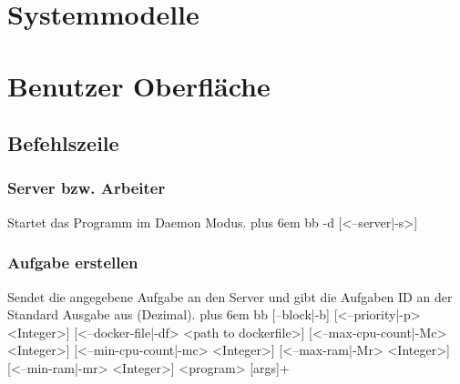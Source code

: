 \documentclass[a4paper,12pt]{article}
\makeatletter
\newenvironment{mycode}
 {\def\@xobeysp{\ }\verbatim\rightskip=0pt plus 6em\relax}
 {\endverbatim}
\makeatother
\begin{document}








\section{Systemmodelle}


\section{Benutzer Oberfläche}
\subsection{Befehlszeile}
\subsubsection{Server bzw. Arbeiter}
Startet das Programm im \gls{Daemon} Modus.
\begin{mycode}
bb -d [<--server|-s>]
\end{mycode}

\subsubsection{Aufgabe erstellen}
Sendet die angegebene Aufgabe an den Server und gibt die Aufgaben ID an der Standard Ausgabe aus (Dezimal).
\begin{mycode}
bb [--block|-b] [<--priority|-p> <Integer>] [<--docker-file|-df> <path to dockerfile>] [<--max-cpu-count|-Mc> <Integer>] [<--min-cpu-count|-mc> <Integer>] [<--max-ram|-Mr> <Integer>] [<--min-ram|-mr> <Integer>] <program> [args]+
\end{mycode}
\end{document}
